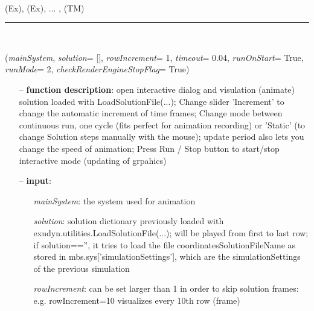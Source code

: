 \begin{itemize}[leftmargin=1.4cm]
\begin{itemize}[leftmargin=1.4cm]
\begin{itemize}[leftmargin=0.5cm]
\begin{itemize}[leftmargin=1.4cm]
\begin{itemize}[leftmargin=1.4cm]
\begin{itemize}[leftmargin=0.5cm]
\begin{itemize}[leftmargin=1.4cm]
\begin{itemize}[leftmargin=0.5cm]
\begin{itemize}[leftmargin=1.4cm]
\begin{itemize}[leftmargin=1.4cm]
\\  (Ex), 
 (Ex), 
 ...
, 
 (TM)\ei

%
\noindent\rule{8cm}{0.75pt}\vspace{1pt} \\ 
\begin{flushleft}
\label{sec:interactive:SolutionViewer}
({\it mainSystem}, {\it solution}= [], {\it rowIncrement}= 1, {\it timeout}= 0.04, {\it runOnStart}= True, {\it runMode}= 2, {\it checkRenderEngineStopFlag}= True)
\end{flushleft}
\setlength{\itemindent}{0.7cm}
\begin{itemize}[leftmargin=0.7cm]
  \item[--]  {\bf function description}: open interactive dialog and visulation (animate) solution loaded with LoadSolutionFile(...); Change slider 'Increment' to change the automatic increment of time frames; Change mode between continuous run, one cycle (fits perfect for animation recording) or 'Static' (to change Solution steps manually with the mouse); update period also lets you change the speed of animation; Press Run / Stop button to start/stop interactive mode (updating of grpahics)  \item[--]  {\bf input}: \vspace{-6pt}
  \begin{itemize}[leftmargin=1.2cm]
\setlength{\itemindent}{-0.7cm}
    \item[] {\it mainSystem}: the system used for animation
    \item[] {\it   solution}: solution dictionary previously loaded with exudyn.utilities.LoadSolutionFile(...); will be played from first to last row; if solution=='', it tries to load the file coordinatesSolutionFileName as stored in mbs.sys['simulationSettings'], which are the simulationSettings of the previous simulation
    \item[] {\it   rowIncrement}: can be set larger than 1 in order to skip solution frames: e.g. rowIncrement=10 visualizes every 10th row (frame)

\end{itemize}
\end{itemize}
\end{itemize}
\end{itemize}
\end{itemize}
\end{itemize}
\end{itemize}
\end{itemize}
\end{itemize}
\end{itemize}
\end{itemize}
\end{itemize}
